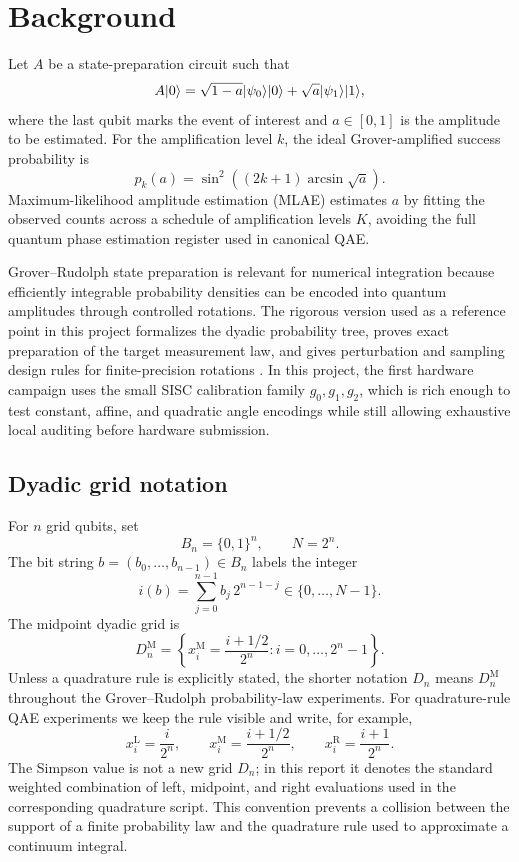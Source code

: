 \section{Background}
\label{sec:background}

Let \(A\) be a state-preparation circuit such that
\[
  A\lvert 0\rangle
  =
  \sqrt{1-a}\lvert \psi_0\rangle\lvert 0\rangle
  +
  \sqrt{a}\lvert \psi_1\rangle\lvert 1\rangle,
\]
where the last qubit marks the event of interest and \(a\in[0,1]\) is the
amplitude to be estimated. For the amplification level \(k\), the ideal
Grover-amplified success probability is
\[
  p_k(a)
  =
  \sin^2\!\left((2k+1)\arcsin\sqrt{a}\right).
\]
Maximum-likelihood amplitude estimation (MLAE) estimates \(a\) by fitting the
observed counts across a schedule of amplification levels \(K\), avoiding the
full quantum phase estimation register used in canonical QAE.

Grover--Rudolph state preparation \cite{grover2002creating} is relevant for
numerical integration because efficiently integrable probability densities can
be encoded into quantum amplitudes through controlled rotations. The rigorous
version used as a reference point in this project formalizes the dyadic
probability tree, proves exact preparation of the target measurement law, and
gives perturbation and sampling design rules for finite-precision rotations
\cite{falco2026grproof}. In this project, the first hardware campaign uses the
small SISC calibration family \(g_0,g_1,g_2\), which is rich enough to test
constant, affine, and quadratic angle encodings while still allowing exhaustive
local auditing before hardware submission.

\subsection{Dyadic grid notation}
\label{subsec:dyadic-grid-notation}

For \(n\) grid qubits, set
\[
  B_n=\{0,1\}^n,\qquad N=2^n.
\]
The bit string \(b=(b_0,\ldots,b_{n-1})\in B_n\) labels the integer
\[
  i(b)=\sum_{j=0}^{n-1} b_j\,2^{n-1-j}\in\{0,\ldots,N-1\}.
\]
The midpoint dyadic grid is
\[
  D_n^{\mathrm{M}}
  =
  \left\{
    x_i^{\mathrm{M}}=\frac{i+1/2}{2^n}: i=0,\ldots,2^n-1
  \right\}.
\]
Unless a quadrature rule is explicitly stated, the shorter notation \(D_n\)
means \(D_n^{\mathrm{M}}\) throughout the Grover--Rudolph probability-law
experiments. For quadrature-rule QAE experiments we keep the rule visible and
write, for example,
\[
  x_i^{\mathrm{L}}=\frac{i}{2^n},\qquad
  x_i^{\mathrm{M}}=\frac{i+1/2}{2^n},\qquad
  x_i^{\mathrm{R}}=\frac{i+1}{2^n}.
\]
The Simpson value is not a new grid \(D_n\); in this report it denotes the
standard weighted combination of left, midpoint, and right evaluations used in
the corresponding quadrature script. This convention prevents a collision
between the support of a finite probability law and the quadrature rule used
to approximate a continuum integral.

